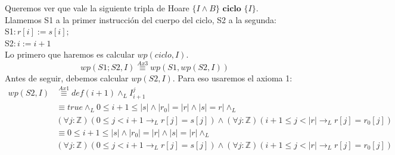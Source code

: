 \documentclass{article}
\begin{document}
\begin{enumerate}[label=\alph*)]
	Queremos ver que vale la siguiente tripla de Hoare $\{I\wedge B\} \textbf{ ciclo } \{I\}$.\\
	Llamemos S1 a la primer instrucción del cuerpo del ciclo, S2 a la segunda:\\
	S1$: r[i]:=s[i];$\\
	S2$: i:=i+1$\\
	Lo primero que haremos es calcular $wp(ciclo,I)$.
	\begin{equation}wp(S1;S2,I)\stackrel{Ax3}{\equiv}wp(S1,wp(S2,I))\end{equation}
	Antes de seguir, debemos calcular $wp(S2,I)$. Para eso usaremos el axioma 1:
	\begin{align*}
	wp(S2,I)&\stackrel{Ax1}{\equiv}def(i+1)\wedge_L I_{i+1}^{j}\\
		&\equiv true\wedge_L 0\leq i+1\leq |s| \wedge |r_0|=|r|\wedge |s|=r|\wedge_L \\
		&(\forall j:\mathbb{Z})(0\leq j<i+1 \rightarrow_L r[j]=s[j])\wedge (\forall j:\mathbb{Z})(i+1\leq j<|r|\rightarrow_L r[j]=r_0[j])\\
		&\equiv 0\leq i+1\leq |s| \wedge |r_0|=|r|\wedge |s|=|r|\wedge_L \\
		&(\forall j:\mathbb{Z})(0\leq j<i+1 \rightarrow_L r[j]=s[j])\wedge (\forall j:\mathbb{Z})(i+1\leq j<|r|\rightarrow_L r[j]=r_0[j])
	\end{align*}
	

\end{enumerate}
\end{document}
